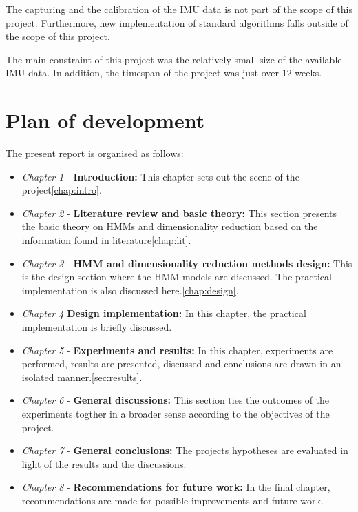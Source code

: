 The capturing and the calibration of the IMU data is not part of the scope of this project. Furthermore, new implementation of standard algorithms falls outside of the scope of this project. 

The main constraint of this project was the relatively small size of the available IMU data. In addition, the timespan of the project was just over 12 weeks.
\section{Plan of development}
The present report is organised as follows:
\begin{itemize}
	\item \textit{Chapter 1} - \textbf{Introduction:} This chapter sets out the scene of the project\ref{chap:intro}. 
	\item \textit{Chapter 2} - \textbf{Literature review and basic theory:} This section presents the basic theory on HMMs and dimensionality reduction based on the information found in literature\ref{chap:lit}.
	\item \textit{Chapter 3} - \textbf{HMM and dimensionality reduction methods design:} This is the design section where the HMM models are discussed. The practical implementation is also discussed here.\ref{chap:design}.
	\item \textit{Chapter 4}  \textbf{Design implementation:} In this chapter, the practical implementation is briefly discussed.
	\item \textit{Chapter 5} - \textbf{Experiments and results:} In this chapter, experiments are performed, results are presented, discussed and conclusions are drawn in an isolated manner.\ref{sec:results}.
	\item \textit{Chapter 6} - \textbf{General discussions:} This section ties the outcomes of the experiments togther in a broader sense according to the objectives of the project.
	\item \textit{Chapter 7} - \textbf{General conclusions:} The projects hypotheses are evaluated in light of the results and the discussions.
	\item \textit{Chapter 8} - \textbf{Recommendations for future work:} In the final chapter, recommendations are made for possible improvements and future work.
\end{itemize}
